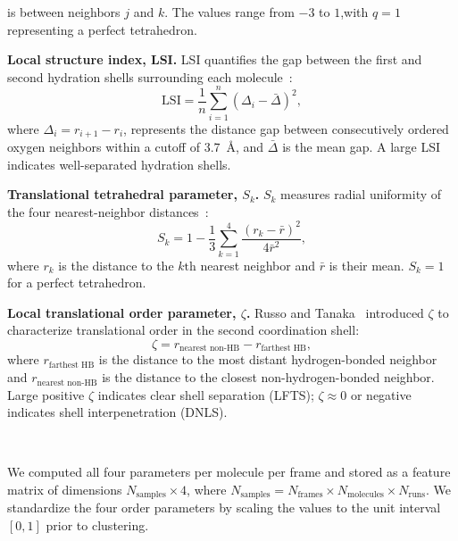 \documentclass[aps, amsmath,amssymb, reprint, twocolumn, superscriptaddress]{revtex4-1}
\begin{document}
 is  between neighbors $j$ and $k$. The values range from $-3$ to $1$,with $q=1$ representing a perfect tetrahedron.

\item \textbf{Local structure index, LSI.}
LSI quantifies the gap between the first and second hydration shells surrounding each molecule~\cite{shiratani_growth_1996}:
\begin{equation}
\text{LSI} = \frac{1}{n}\sum_{i=1}^{n}\!\left(\Delta_i - \bar{\Delta}\right)^{2},
\label{eq:LSI}
\end{equation}
where $\Delta_i = r_{i+1} - r_i$, represents the distance gap between consecutively ordered oxygen neighbors within a cutoff of 3.7~\AA, and $\bar{\Delta}$ is the mean gap. A large LSI indicates well-separated hydration shells.

\item \textbf{Translational tetrahedral parameter, $S_k$.}
$S_k$ measures radial uniformity of the four nearest-neighbor distances~\cite{duboue-dijon_characterization_2015}:
\begin{equation}
S_k = 1 - \frac{1}{3}\sum_{k=1}^{4}\frac{(r_k - \bar{r})^{2}}{4\bar{r}^{2}},
\end{equation}
where $r_k$ is the distance to the $k\text{th}$ nearest neighbor and $\bar{r}$ is their mean. $S_k = 1$ for a perfect tetrahedron.

\item \textbf{Local translational order parameter, $\zeta$.}
Russo and Tanaka~\cite{russo_understanding_2014} introduced $\zeta$ to characterize translational order in the second coordination shell:
\begin{equation}
\zeta = r_{\text{nearest non-HB}} - r_{\text{farthest HB}},
\label{eq:zeta}
\end{equation}
where $r_{\text{farthest HB}}$ is the distance to the most distant hydrogen-bonded neighbor and $r_{\text{nearest non-HB}}$ is the distance to the closest non-hydrogen-bonded neighbor. Large positive $\zeta$ indicates clear shell separation (LFTS); $\zeta \approx 0$ or negative indicates shell interpenetration (DNLS).

\

We computed all four parameters per molecule per frame and stored as a feature matrix of dimensions $N_{\text{samples}} \times 4$, where $N_{\text{samples}} = N_{\text{frames}} \times N_{\text{molecules}} \times N_{\text{runs}}$. We standardize the four order parameters by scaling the values to the unit interval $[0,1]$ prior to clustering. 
\end{document}
